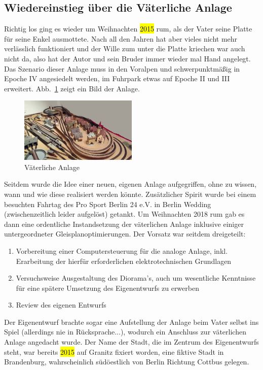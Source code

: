 \subsection{Wiedereinstieg \"uber die V\"aterliche Anlage}
\label{sec:theReturn}

Richtig los ging es wieder um Weihnachten \hl{2015} rum, als der Vater seine Platte f\"ur seine Enkel ausmottete.
Nach all den Jahren hat aber vieles nicht mehr verl\"asslich funktioniert und der Wille zum unter die Platte kriechen war auch nicht da, also hat der Autor und sein Bruder immer wieder mal Hand angelegt.
Das Szenario dieser Anlage muss in den Voralpen und schwerpunktm\"a{\ss}ig in Epoche IV angesiedelt werden, im Fuhrpark etwas auf Epoche II und III erweitert.
Abb.~\ref{img:elder_maps_anlage_papa_2019} zeigt ein Bild der Anlage.

\begin{figure}[h]
\centering
  \includegraphics[width=0.5\textwidth]{img/elder_maps/anlage_papa_2019.png}
	\caption{V\"aterliche Anlage}
	\label{img:elder_maps_anlage_papa_2019}
\end{figure}

Seitdem wurde die Idee einer neuen, eigenen Anlage aufgegriffen, ohne zu wissen, wann und wie diese realisiert werden k\"onnte.
Zus\"atzlicher Spirit wurde bei einem besuchten Fahrtag des Pro Sport Berlin 24 e.V. in Berlin Wedding (zwischenzeitlich leider aufgel\"ost) getankt.
Um Weihnachten 2018 rum gab es dann eine ordentliche Instandsetzung der v\"aterlichen Anlage inklusive einiger untergeordneter Gleisplanoptimierungen.
Der Vorsatz war seitdem dreigeteilt:
\begin{enumerate}
	\item Vorbereitung einer Computersteuerung f\"ur die analoge Anlage, inkl. Erarbeitung der hierf\"ur erforderlichen elektrotechnischen Grundlagen
	\item Versuchsweise Ausgestaltung des Diorama's, auch um wesentliche Kenntnisse f\"ur eine sp\"atere Umsetzung des Eigenentwurfs zu erwerben
	\item Review des eigenen Entwurfs
\end{enumerate}
Der Eigenentwurf brachte sogar eine Aufstellung der Anlage beim Vater selbst ins Spiel (allerdings nie in R\"ucksprache...), wodurch ein Anschluss zur v\"aterlichen Anlage angedacht wurde.
Der Name der Stadt, die im Zentrum des Eigenentwurfs steht, war bereits \hl{2015} auf Granitz fixiert worden, eine fiktive Stadt in Brandenburg, wahrscheinlich s\"ud\"oestlich von Berlin Richtung Cottbus gelegen.

